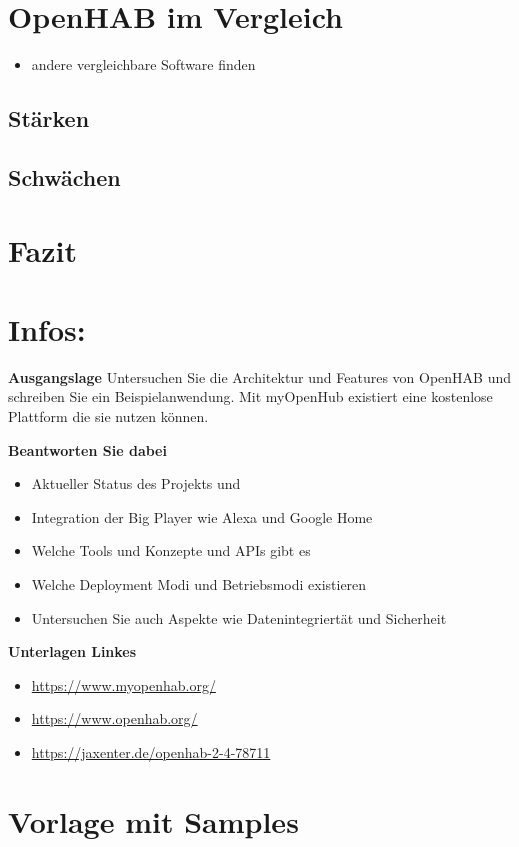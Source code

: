 \section{OpenHAB im Vergleich}
\begin{itemize}
	\item andere vergleichbare Software finden
\end{itemize}
\subsection{Stärken}
\subsection{Schwächen}

\section{Fazit}

\section{Infos:}
\textbf{Ausgangslage}
Untersuchen Sie die Architektur und Features von OpenHAB und
schreiben Sie ein Beispielanwendung.
Mit myOpenHub existiert eine kostenlose Plattform die sie nutzen
können.

\textbf{Beantworten Sie dabei}
\begin{itemize}
 \item Aktueller Status des Projekts und  \item Integration der Big Player wie Alexa und Google Home
 \item Welche Tools und Konzepte und APIs gibt es
 \item Welche Deployment Modi und Betriebsmodi existieren
 \item Untersuchen Sie auch Aspekte wie Datenintegriertät und Sicherheit
\end{itemize}

\textbf{Unterlagen Linkes}
\begin{itemize}
	\item \url{https://www.myopenhab.org/}
	\item \url{https://www.openhab.org/}
	\item \url{https://jaxenter.de/openhab-2-4-78711}
\end{itemize}


\section{Vorlage mit Samples}

